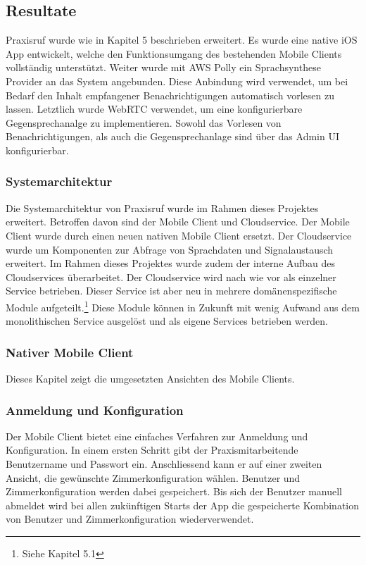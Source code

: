 \subsection{Resultate}

Praxisruf wurde wie in Kapitel 5 beschrieben erweitert.
Es wurde eine native iOS App entwickelt, welche den Funktionsumgang des bestehenden Mobile Clients vollständig unterstützt.
Weiter wurde mit AWS Polly ein Sprachsynthese Provider an das System angebunden.
Diese Anbindung wird verwendet, um bei Bedarf den Inhalt empfangener Benachrichtigungen automatisch vorlesen zu lassen.
Letztlich wurde WebRTC verwendet, um eine konfigurierbare Gegensprechanalge zu implementieren.
Sowohl das Vorlesen von Benachrichtigungen, als auch die Gegensprechanlage sind über das Admin UI konfigurierbar.

\subsubsection{Systemarchitektur}

Die Systemarchitektur von Praxisruf wurde im Rahmen dieses Projektes erweitert.
Betroffen davon sind der Mobile Client und Cloudservice.
Der Mobile Client wurde durch einen neuen nativen Mobile Client ersetzt.
Der Cloudservice wurde um Komponenten zur Abfrage von Sprachdaten und Signalaustausch erweitert.
Im Rahmen dieses Projektes wurde zudem der interne Aufbau des Cloudservices überarbeitet.
Der Cloudservice wird nach wie vor als einzelner Service betrieben.
Dieser Service ist aber neu in mehrere domänenspezifische Module aufgeteilt.\footnote{Siehe Kapitel 5.1}
Diese Module können in Zukunft mit wenig Aufwand aus dem monolithischen Service ausgelöst und als eigene Services betrieben werden.

\clearpage

\subsubsection{Nativer Mobile Client}

Dieses Kapitel zeigt die umgesetzten Ansichten des Mobile Clients.

\subsubsection*{Anmeldung und Konfiguration}

Der Mobile Client bietet eine einfaches Verfahren zur Anmeldung und Konfiguration.
In einem ersten Schritt gibt der Praxismitarbeitende Benutzername und Passwort ein.
Anschliessend kann er auf einer zweiten Ansicht, die gewünschte Zimmerkonfiguration wählen.
Benutzer und Zimmerkonfiguration werden dabei gespeichert.
Bis sich der Benutzer manuell abmeldet wird bei allen zukünftigen Starts der App die gespeicherte Kombination von Benutzer und Zimmerkonfiguration wiederverwendet.

